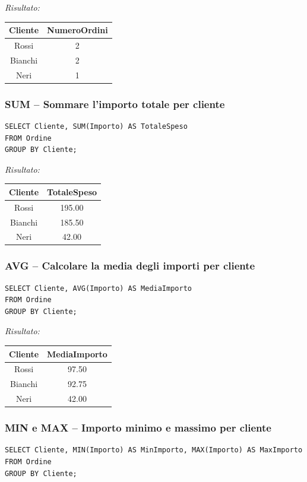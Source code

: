 \documentclass[a4paper,12pt]{article}
\begin{document}
\textit{Risultato:}
\begin{center}
\begin{tabular}{|c|c|}
\hline
Cliente & NumeroOrdini \\
\hline
Rossi & 2 \\
Bianchi & 2 \\
Neri & 1 \\
\hline
\end{tabular}
\end{center}

\subsubsection{SUM -- Sommare l'importo totale per cliente}
\begin{verbatim}
SELECT Cliente, SUM(Importo) AS TotaleSpeso
FROM Ordine
GROUP BY Cliente;
\end{verbatim}

\textit{Risultato:}
\begin{center}
\begin{tabular}{|c|c|}
\hline
Cliente & TotaleSpeso \\
\hline
Rossi & 195.00 \\
Bianchi & 185.50 \\
Neri & 42.00 \\
\hline
\end{tabular}
\end{center}

\subsubsection{AVG -- Calcolare la media degli importi per cliente}
\begin{verbatim}
SELECT Cliente, AVG(Importo) AS MediaImporto
FROM Ordine
GROUP BY Cliente;
\end{verbatim}

\textit{Risultato:}
\begin{center}
\begin{tabular}{|c|c|}
\hline
Cliente & MediaImporto \\
\hline
Rossi & 97.50 \\
Bianchi & 92.75 \\
Neri & 42.00 \\
\hline
\end{tabular}
\end{center}

\subsubsection{MIN e MAX -- Importo minimo e massimo per cliente}
\begin{verbatim}
SELECT Cliente, MIN(Importo) AS MinImporto, MAX(Importo) AS MaxImporto
FROM Ordine
GROUP BY Cliente;
\end{verbatim}
\end{document}
